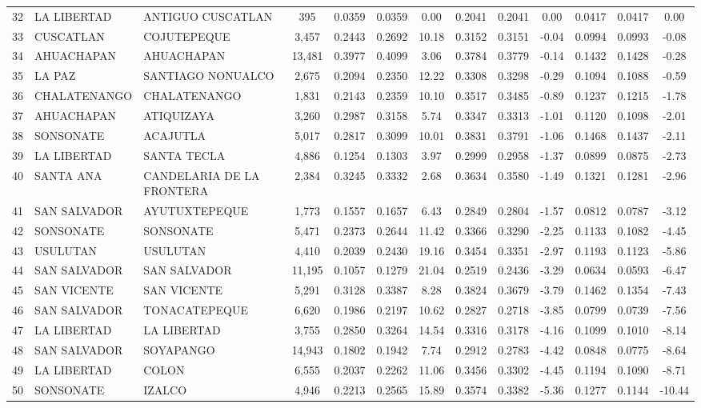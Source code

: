 \begin{table}[H]
{\begin{tabular}{lllcccccccccc}
32	&	LA LIBERTAD	&	ANTIGUO CUSCATLAN	&	395	&	0.0359	&	0.0359	&	0.00	&	0.2041	&	0.2041	&	0.00	&	0.0417	&	0.0417	&	0.00	\\ 
33	&	CUSCATLAN	&	COJUTEPEQUE	&	3,457	&	0.2443	&	0.2692	&	10.18	&	0.3152	&	0.3151	&	-0.04	&	0.0994	&	0.0993	&	-0.08	\\ 
34	&	AHUACHAPAN	&	AHUACHAPAN	&	13,481	&	0.3977	&	0.4099	&	3.06	&	0.3784	&	0.3779	&	-0.14	&	0.1432	&	0.1428	&	-0.28	\\ 
35	&	LA PAZ	&	SANTIAGO NONUALCO	&	2,675	&	0.2094	&	0.2350	&	12.22	&	0.3308	&	0.3298	&	-0.29	&	0.1094	&	0.1088	&	-0.59	\\ 
36	&	CHALATENANGO	&	CHALATENANGO	&	1,831	&	0.2143	&	0.2359	&	10.10	&	0.3517	&	0.3485	&	-0.89	&	0.1237	&	0.1215	&	-1.78	\\ 
37	&	AHUACHAPAN	&	ATIQUIZAYA	&	3,260	&	0.2987	&	0.3158	&	5.74	&	0.3347	&	0.3313	&	-1.01	&	0.1120	&	0.1098	&	-2.01	\\ 
38	&	SONSONATE	&	ACAJUTLA	&	5,017	&	0.2817	&	0.3099	&	10.01	&	0.3831	&	0.3791	&	-1.06	&	0.1468	&	0.1437	&	-2.11	\\ 
39	&	LA LIBERTAD	&	SANTA TECLA	&	4,886	&	0.1254	&	0.1303	&	3.97	&	0.2999	&	0.2958	&	-1.37	&	0.0899	&	0.0875	&	-2.73	\\ 
40	&	SANTA ANA	&	CANDELARIA DE LA FRONTERA	&	2,384	&	0.3245	&	0.3332	&	2.68	&	0.3634	&	0.3580	&	-1.49	&	0.1321	&	0.1281	&	-2.96	\\ 
41	&	SAN SALVADOR	&	AYUTUXTEPEQUE	&	1,773	&	0.1557	&	0.1657	&	6.43	&	0.2849	&	0.2804	&	-1.57	&	0.0812	&	0.0787	&	-3.12	\\ 
42	&	SONSONATE	&	SONSONATE	&	5,471	&	0.2373	&	0.2644	&	11.42	&	0.3366	&	0.3290	&	-2.25	&	0.1133	&	0.1082	&	-4.45	\\ 
43	&	USULUTAN	&	USULUTAN	&	4,410	&	0.2039	&	0.2430	&	19.16	&	0.3454	&	0.3351	&	-2.97	&	0.1193	&	0.1123	&	-5.86	\\ 
44	&	SAN SALVADOR	&	SAN SALVADOR	&	11,195	&	0.1057	&	0.1279	&	21.04	&	0.2519	&	0.2436	&	-3.29	&	0.0634	&	0.0593	&	-6.47	\\ 
45	&	SAN VICENTE	&	SAN VICENTE	&	5,291	&	0.3128	&	0.3387	&	8.28	&	0.3824	&	0.3679	&	-3.79	&	0.1462	&	0.1354	&	-7.43	\\ 
46	&	SAN SALVADOR	&	TONACATEPEQUE	&	6,620	&	0.1986	&	0.2197	&	10.62	&	0.2827	&	0.2718	&	-3.85	&	0.0799	&	0.0739	&	-7.56	\\ 
47	&	LA LIBERTAD	&	LA LIBERTAD	&	3,755	&	0.2850	&	0.3264	&	14.54	&	0.3316	&	0.3178	&	-4.16	&	0.1099	&	0.1010	&	-8.14	\\ 
48	&	SAN SALVADOR	&	SOYAPANGO	&	14,943	&	0.1802	&	0.1942	&	7.74	&	0.2912	&	0.2783	&	-4.42	&	0.0848	&	0.0775	&	-8.64	\\ 
49	&	LA LIBERTAD	&	COLON	&	6,555	&	0.2037	&	0.2262	&	11.06	&	0.3456	&	0.3302	&	-4.45	&	0.1194	&	0.1090	&	-8.71	\\ 
50	&	SONSONATE	&	IZALCO	&	4,946	&	0.2213	&	0.2565	&	15.89	&	0.3574	&	0.3382	&	-5.36	&	0.1277	&	0.1144	&	-10.44	\\  \bottomrule


\end{tabular}}
\end{table}
